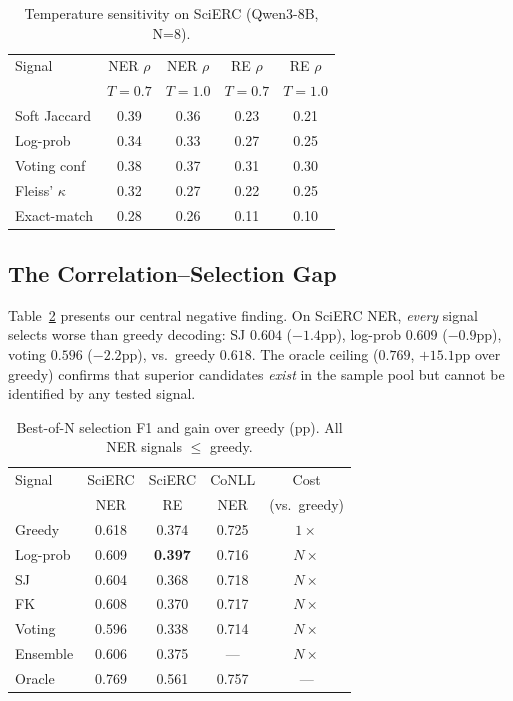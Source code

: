 \documentclass[11pt,a4paper]{article}
\begin{document}
\begin{table}[t]
\centering
\small
\caption{Temperature sensitivity on SciERC (Qwen3-8B, N=8).}
\label{tab:temperature}
\begin{tabular}{lcccc}
\toprule
Signal & NER $\rho$ & NER $\rho$ & RE $\rho$ & RE $\rho$ \\
 & $T{=}0.7$ & $T{=}1.0$ & $T{=}0.7$ & $T{=}1.0$ \\
\midrule
Soft Jaccard & 0.39 & 0.36 & 0.23 & 0.21 \\
Log-prob & 0.34 & 0.33 & 0.27 & 0.25 \\
Voting conf & 0.38 & 0.37 & 0.31 & 0.30 \\
Fleiss' $\kappa$ & 0.32 & 0.27 & 0.22 & 0.25 \\
Exact-match & 0.28 & 0.26 & 0.11 & 0.10 \\
\bottomrule
\end{tabular}
\end{table}

\subsection{The Correlation--Selection Gap}
\label{sec:selection}

Table~\ref{tab:selection} presents our central negative finding. On SciERC NER, \emph{every} signal selects worse than greedy decoding: SJ $0.604$ ($-1.4$pp), log-prob $0.609$ ($-0.9$pp), voting $0.596$ ($-2.2$pp), vs.\ greedy $0.618$. The oracle ceiling ($0.769$, $+15.1$pp over greedy) confirms that superior candidates \emph{exist} in the sample pool but cannot be identified by any tested signal.

\begin{table}[t]
\centering
\small
\caption{Best-of-N selection F1 and gain over greedy (pp). All NER signals $\leq$ greedy.}
\label{tab:selection}
\begin{tabular}{lcccc}
\toprule
Signal & SciERC & SciERC & CoNLL & Cost \\
 & NER & RE & NER & (vs.\ greedy) \\
\midrule
Greedy & 0.618 & 0.374 & 0.725 & $1\times$ \\
Log-prob & 0.609 & \textbf{0.397} & 0.716 & $N\times$ \\
SJ & 0.604 & 0.368 & 0.718 & $N\times$ \\
FK & 0.608 & 0.370 & 0.717 & $N\times$ \\
Voting & 0.596 & 0.338 & 0.714 & $N\times$ \\
Ensemble & 0.606 & 0.375 & --- & $N\times$ \\
\midrule
Oracle & 0.769 & 0.561 & 0.757 & --- \\
\bottomrule
\end{tabular}
\end{table}
\end{document}
